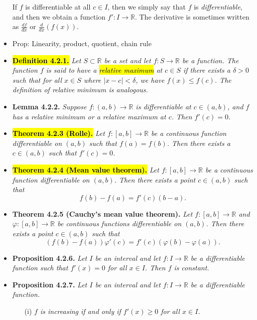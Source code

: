 \documentclass[a4paper,10pt]{article}
\begin{document}
\begin{multicols}{2}
\begin{itemize}
    If \( f \) is differentiable at all \( c \in I \), then we simply say that \( f \) is \textit{differentiable}, and then we obtain a function \( f' : I \to \mathbb{R} \). The derivative is sometimes written as \( \frac{df}{dx} \) or \( \frac{d}{dx}(f(x)) \).
    \item Prop: Linearity, product, quotient, chain rule
    \item \hl{\textbf{Definition 4.2.1.}} \textit{Let \( S \subset \mathbb{R} \) be a set and let \( f : S \to \mathbb{R} \) be a function. The function \( f \) is said to have a \hl{\textit{relative maximum}} at \( c \in S \) if there exists a \( \delta > 0 \) such that for all \( x \in S \) where \( |x - c| < \delta \), we have \( f(x) \leq f(c) \). The definition of \textit{relative minimum} is analogous.}
    \item \textbf{Lemma 4.2.2.} \textit{Suppose \( f : (a, b) \to \mathbb{R} \) is differentiable at \( c \in (a, b) \), and \( f \) has a relative minimum or a relative maximum at \( c \). Then \( f'(c) = 0 \).}
    \item \hl{\textbf{Theorem 4.2.3 (Rolle).}} \textit{Let \( f : [a, b] \to \mathbb{R} \) be a continuous function differentiable on \( (a, b) \) such that \( f(a) = f(b) \). Then there exists a \( c \in (a, b) \) such that \( f'(c) = 0 \).}
    \item \hl{\textbf{Theorem 4.2.4 (Mean value theorem).}} \textit{Let \( f : [a, b] \to \mathbb{R} \) be a continuous function differentiable on \( (a, b) \). Then there exists a point \( c \in (a, b) \) such that}
    \[
    f(b) - f(a) = f'(c)(b - a).
    \]
    \item \textbf{Theorem 4.2.5 (Cauchy’s mean value theorem).} \textit{Let \( f : [a, b] \to \mathbb{R} \) and \( \varphi : [a, b] \to \mathbb{R} \) be continuous functions differentiable on \( (a, b) \). Then there exists a point \( c \in (a, b) \) such that}
    \[
    (f(b) - f(a)) \varphi'(c) = f'(c)(\varphi(b) - \varphi(a)).
    \]
    \item \textbf{Proposition 4.2.6.} \textit{Let \( I \) be an interval and let \( f : I \to \mathbb{R} \) be a differentiable function such that \( f'(x) = 0 \) for all \( x \in I \). Then \( f \) is constant.}
    \item \textbf{Proposition 4.2.7.} \textit{Let \( I \) be an interval and let \( f : I \to \mathbb{R} \) be a differentiable function.}
    \begin{itemize}
      \item[(i)] \textit{\( f \) is increasing if and only if \( f'(x) \geq 0 \) for all \( x \in I \).}

\end{itemize}
\end{itemize}
\end{multicols}
\end{document}
